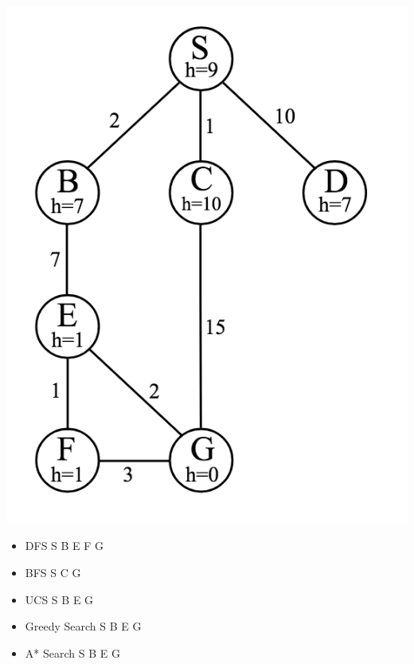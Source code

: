 \documentclass[11pt]{article}
\begin{document}
\begin{enumerate}
\includegraphics[scale=0.7, center]{img/tree2}

\begin{itemize}
\item DFS
{\color{blue} S \rightarrow B \rightarrow E \rightarrow F \rightarrow G}

\bigskip
\bigskip
\item BFS
{\color{blue} S \rightarrow C \rightarrow G}

\bigskip
\bigskip
\item UCS
{\color{blue} S \rightarrow B \rightarrow E \rightarrow G}

\bigskip
\bigskip
\item Greedy Search
{\color{blue} S \rightarrow B \rightarrow E \rightarrow G}

\bigskip
\bigskip
\item A* Search
{\color{blue} S \rightarrow B \rightarrow E \rightarrow G}

\end{itemize}


\end{enumerate}
\end{document}
